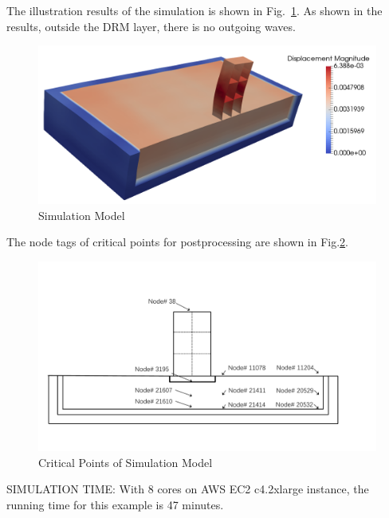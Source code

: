The illustration results of the simulation is shown in Fig.~\ref{fig_decon_3D_motion_3D_model_results_structure}.
As shown in the results, outside the DRM layer, there is no outgoing waves. 

\begin{figure}[H]
  \centering
  \includegraphics[width = 12cm]{./Figure-files/nonlinear_analysis_steps/soil-structure/DRM3D_motion3D_structure.png}
  \caption{Simulation Model}
  \label{fig_decon_3D_motion_3D_model_results_structure}
\end{figure}

The node tags of critical points for postprocessing are shown in Fig.\ref{fig_points_3D_motion_3D_model_results_structure}.

\begin{figure}[H]
  \centering
  \includegraphics[width = 12cm]{./Figure-files/nonlinear_analysis_steps/soil-structure/soil-structure_node_location.pdf}
  \caption{Critical Points of Simulation Model}
  \label{fig_points_3D_motion_3D_model_results_structure}
\end{figure}

SIMULATION TIME: With 8 cores on AWS EC2 c4.2xlarge instance, the running time for this example is 47 minutes.

